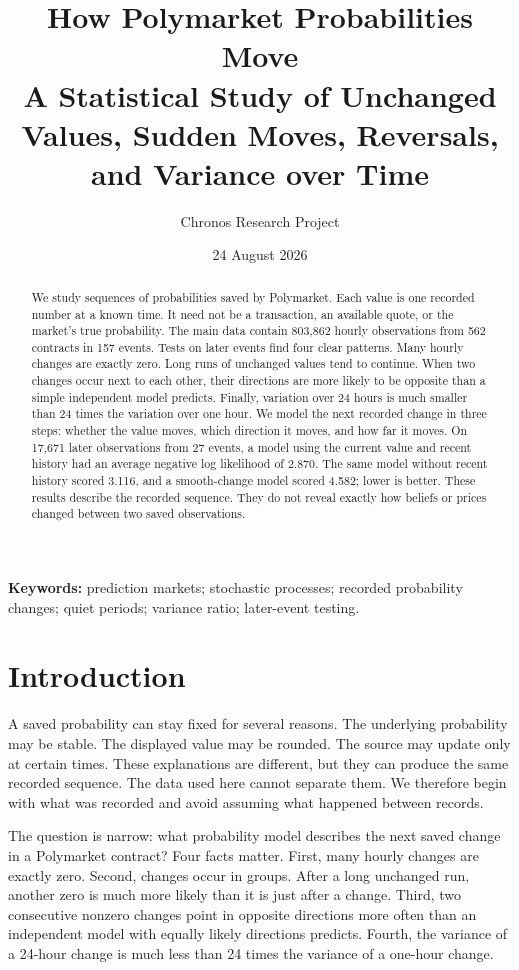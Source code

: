 \documentclass[10pt,twoside]{article}
\title{\vspace{-1.5em}\textbf{How Polymarket Probabilities Move}\\[0.35em]
\large A Statistical Study of Unchanged Values, Sudden Moves, Reversals, and Variance over Time}
\author{Chronos Research Project}
\date{24 August 2026}
\begin{document}
\raggedbottom
\pagestyle{plain}
\maketitle
\thispagestyle{plain}

\begin{abstract}
We study sequences of probabilities saved by Polymarket. Each value is one recorded number at a known time. It need not be a transaction, an available quote, or the market's true probability. The main data contain 803,862 hourly observations from 562 contracts in 157 events. Tests on later events find four clear patterns. Many hourly changes are exactly zero. Long runs of unchanged values tend to continue. When two changes occur next to each other, their directions are more likely to be opposite than a simple independent model predicts. Finally, variation over 24 hours is much smaller than 24 times the variation over one hour. We model the next recorded change in three steps: whether the value moves, which direction it moves, and how far it moves. On 17,671 later observations from 27 events, a model using the current value and recent history had an average negative log likelihood of 2.870. The same model without recent history scored 3.116, and a smooth-change model scored 4.582; lower is better. These results describe the recorded sequence. They do not reveal exactly how beliefs or prices changed between two saved observations.
\end{abstract}

\noindent\textbf{Keywords:} prediction markets; stochastic processes; recorded probability changes; quiet periods; variance ratio; later-event testing.

\section{Introduction}

A saved probability can stay fixed for several reasons. The underlying probability may be stable. The displayed value may be rounded. The source may update only at certain times. These explanations are different, but they can produce the same recorded sequence. The data used here cannot separate them. We therefore begin with what was recorded and avoid assuming what happened between records.

The question is narrow: what probability model describes the next saved change in a Polymarket contract? Four facts matter. First, many hourly changes are exactly zero. Second, changes occur in groups. After a long unchanged run, another zero is much more likely than it is just after a change. Third, two consecutive nonzero changes point in opposite directions more often than an independent model with equally likely directions predicts. Fourth, the variance of a 24-hour change is much less than 24 times the variance of a one-hour change.
\end{document}
